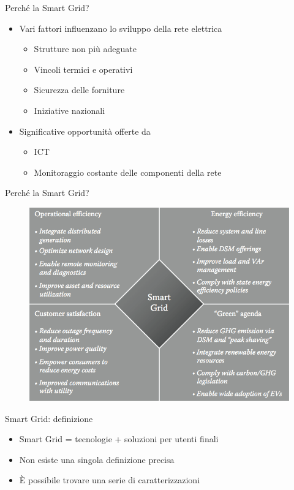 \begin{frame}{Perché la Smart Grid?}
	\begin{itemize}[<+- | alert@+>]
	\item Vari fattori influenzano lo sviluppo della rete elettrica
	 \begin{itemize}
	  	\item Strutture non più adeguate
	  	\item Vincoli termici e operativi
	  	\item Sicurezza delle forniture
	  	\item Iniziative nazionali
	 \end{itemize}
	\item Significative opportunità offerte da 
	\begin{itemize}
	\item ICT
	\item Monitoraggio costante delle componenti della rete
	\end{itemize}
	\end{itemize}
\end{frame}


\begin{frame}{Perché la Smart Grid?}
	\begin{figure}[h] 
		\includegraphics[scale=0.25]{imgs/benefits.png}
	\end{figure}
\end{frame}


\begin{frame}{Smart Grid: definizione}
\begin{itemize}[<+- | alert@+>]
\item Smart Grid = tecnologie + soluzioni per utenti finali
\item Non esiste una singola definizione precisa
\item È possibile trovare una serie di caratterizzazioni
\end{itemize}
\end{frame}

